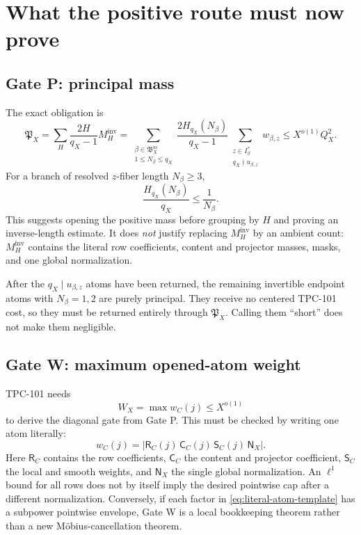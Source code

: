 \section{What the positive route must now prove}
\label{sec:positive-route}

\subsection{Gate P: principal mass}

The exact obligation is
\[
 \mathfrak P_X
 =
 \sum_H\frac{2H}{q_X-1}M_H^{\mathrm{inv}}
 =
 \sum_{\substack{\beta\in\mathfrak B_X^{\mathrm{nc}}\\
                   1\le N_\beta\le q_X}}
 \frac{2H_{q_X}(N_\beta)}{q_X-1}
 \sum_{\substack{z\in I_\beta^\ast\\
                   q_X\nmid u_{\beta,z}}}
 w_{\beta,z}
 \le X^{o(1)}Q_X^2.
\]
For a branch of resolved \(z\)-fiber length \(N_\beta\ge3\),
\[
 \frac{H_{q_X}(N_\beta)}{q_X}
 \le\frac1{N_\beta}.
\]
This suggests opening the positive mass before grouping by \(H\)
and proving an inverse-length estimate.  It does \emph{not} justify
replacing \(M_H^{\mathrm{inv}}\) by an ambient count:
\(M_H^{\mathrm{inv}}\) contains the literal
row coefficients, content and projector masses, masks, and one
global normalization.

After the \(q_X\mid u_{\beta,z}\) atoms have been returned, the
remaining invertible endpoint atoms with \(N_\beta=1,2\) are purely
principal.  They receive no centered TPC-101 cost, so they must be
returned entirely through \(\mathfrak P_X\).  Calling them ``short''
does not make them negligible.

\subsection{Gate W: maximum opened-atom weight}

TPC-101 needs
\[
 W_X=\max w_C(j)\le X^{o(1)}
\]
to derive the diagonal gate from Gate P.  This must be checked by
writing one atom literally:
\begin{equation}
 w_C(j)
 =
 \left|
 \mathsf R_C(j)\,
 \mathsf C_C(j)\,
 \mathsf S_C(j)\,
 \mathsf N_X
 \right|.
\label{eq:literal-atom-template}
\end{equation}
Here \(\mathsf R_C\) contains the row coefficients,
\(\mathsf C_C\) the content and projector coefficient,
\(\mathsf S_C\) the local and smooth weights, and
\(\mathsf N_X\) the single global normalization.
An \(\ell^1\) bound for all rows does not by itself imply the desired
pointwise cap after a different normalization.  Conversely, if each
factor in \eqref{eq:literal-atom-template} has a subpower pointwise
envelope, Gate W is a local bookkeeping theorem rather than a new
M\"obius-cancellation theorem.

